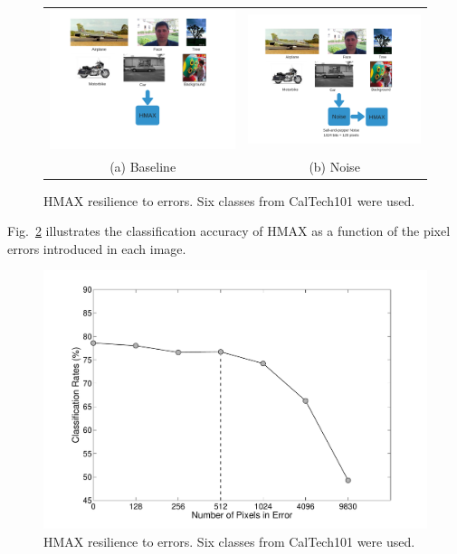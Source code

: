 \begin{figure}[!htb]
\centering
\begin{tabular}{@{}c@{} @{}c@{}}
\includegraphics[width=0.45\linewidth]{./figures/hmax_reliability_a.png} & \includegraphics[width=0.45\linewidth]{./figures/hmax_reliability_b.png}\\[\abovecaptionskip]
\small (a) Baseline & \small (b) Noise
\end{tabular}
\vspace{1pt}
\caption{HMAX resilience to errors. Six classes from CalTech101 were used.}
\label{tab:hmax_reliability}
\end{figure}

Fig.~\ref{fig:hmax_pixel_sensitivity} illustrates the classification accuracy of HMAX as a function of the pixel errors introduced in each image.

\begin{figure}[htb!]
\vspace{0pt}
\centering
\includegraphics[width=0.99\linewidth,trim={20 20 30 20}, clip]{./figures/PixelSensitivityAnalysis.pdf}
\vspace{0pt}
\caption{HMAX resilience to errors. Six classes from CalTech101 were used.}\label{fig:hmax_pixel_sensitivity}
\vspace{0pt}
\end{figure}

